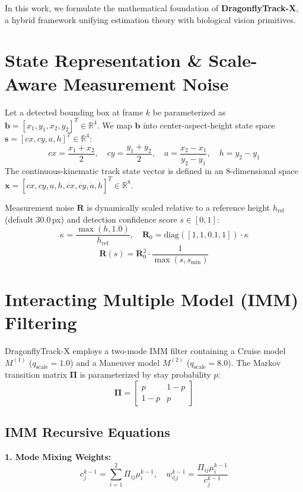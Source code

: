 \documentclass[10pt,journal,compsoc]{IEEEtran}
\begin{document}
In this work, we formulate the mathematical foundation of \textbf{DragonflyTrack-X}, a hybrid framework unifying estimation theory with biological vision primitives.

\section{State Representation \& Scale-Aware Measurement Noise}
Let a detected bounding box at frame $k$ be parameterized as $\mathbf{b} = [x_1, y_1, x_2, y_2]^T \in \mathbb{R}^4$. We map $\mathbf{b}$ into center-aspect-height state space $\mathbf{s} = [cx, cy, a, h]^T \in \mathbb{R}^4$:
\begin{equation}
cx = \frac{x_1 + x_2}{2}, \quad cy = \frac{y_1 + y_2}{2}, \quad a = \frac{x_2 - x_1}{y_2 - y_1}, \quad h = y_2 - y_1
\end{equation}
The continuous-kinematic track state vector is defined in an 8-dimensional space $\mathbf{x} = [cx, cy, a, h, \dot{cx}, \dot{cy}, \dot{a}, \dot{h}]^T \in \mathbb{R}^8$.

Measurement noise $\mathbf{R}$ is dynamically scaled relative to a reference height $h_{\text{ref}}$ (default $30.0$\,px) and detection confidence score $s \in [0, 1]$:
\begin{equation}
\kappa = \frac{\max(h, 1.0)}{h_{\text{ref}}}, \quad \mathbf{R}_0 = \text{diag}([1, 1, 0.1, 1]) \cdot \kappa
\end{equation}
\begin{equation}
\mathbf{R}(s) = \mathbf{R}_0^2 \cdot \frac{1}{\max(s, s_{\min})}
\end{equation}

\section{Interacting Multiple Model (IMM) Filtering}
DragonflyTrack-X employs a two-mode IMM filter containing a Cruise model $M^{(1)}$ ($q_{\text{scale}} = 1.0$) and a Maneuver model $M^{(2)}$ ($q_{\text{scale}} = 8.0$). The Markov transition matrix $\mathbf{\Pi}$ is parameterized by stay probability $p$:
\begin{equation}
\mathbf{\Pi} = \begin{bmatrix} p & 1-p \\ 1-p & p \end{bmatrix}
\end{equation}

\subsection{IMM Recursive Equations}
\textbf{1. Mode Mixing Weights:}
\begin{equation}
c_j^{k-1} = \sum_{i=1}^2 \Pi_{ij} \mu_i^{k-1}, \quad w_{i|j}^{k-1} = \frac{\Pi_{ij} \mu_i^{k-1}}{c_j^{k-1}}
\end{equation}
\end{document}
